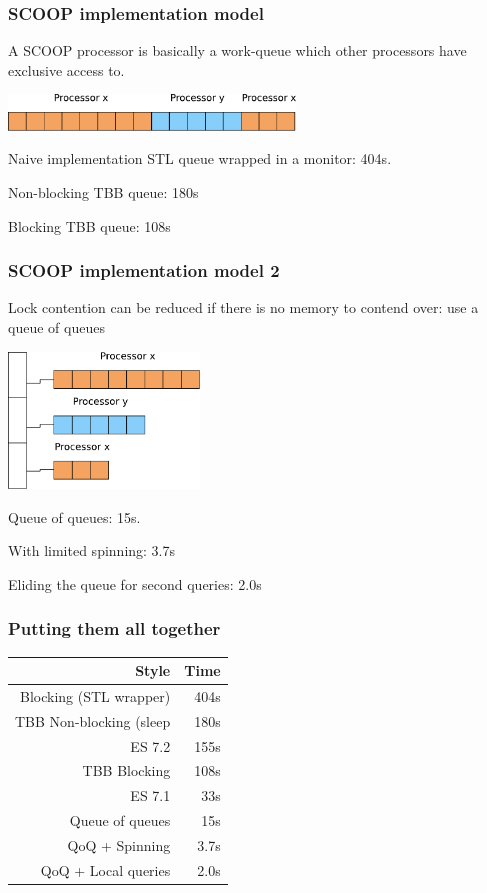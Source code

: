 \documentclass{beamer}
\begin{document}
\begin{frame}
  \frametitle{SCOOP implementation model}
  
  A SCOOP processor is basically a work-queue which
  other processors have exclusive access to.

  \begin{center}
    \includegraphics[width=3in]{queue-naive}
  \end{center}

  Naive implementation STL queue wrapped in a monitor: 404s.

  Non-blocking TBB queue: 180s

  Blocking TBB queue: 108s
\end{frame}

\begin{frame}
  \frametitle{SCOOP implementation model 2}
  
  Lock contention can be reduced if there is no
  memory to contend over:
  use a queue of queues

  \begin{center}
    \includegraphics[width=2in]{queue-of-queues}
  \end{center}

  Queue of queues: 15s.

  With limited spinning: 3.7s

  Eliding the queue for second queries: 2.0s
\end{frame}

\begin{frame}
  \frametitle{Putting them all together}

  \begin{center}
  \begin{tabular}{r|r}
    Style &  Time  \\ \hline
    Blocking (STL wrapper)   &  404s \\
    TBB Non-blocking (sleep  &  180s \\
    ES 7.2                   &  155s \\
    TBB Blocking             &  108s \\
    ES 7.1                   &   33s \\
    Queue of queues          &   15s \\
    QoQ + Spinning           &  3.7s \\
    QoQ + Local queries      &  2.0s \\
  \end{tabular}
  \end{center}
\end{frame}
\end{document}
